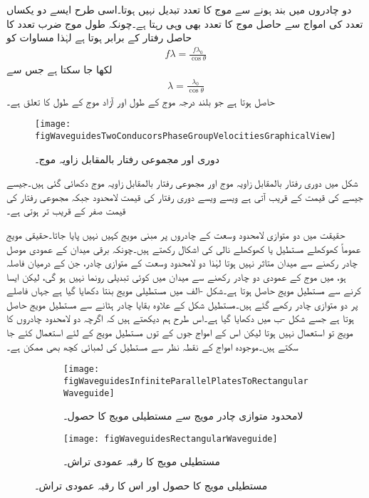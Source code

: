 دو چادروں میں بند ہونے سے  موج کا تعدد تبدیل نہیں ہوتا۔اسی طرح ایسے دو یکساں تعدد کی امواج سے حاصل  موج کا تعدد بھی وہی رہتا ہے۔چونکہ طول موج ضرب تعدد کا حاصل رفتار کے برابر ہوتا ہے لہٰذا مساوات  کو
\begin{align*}
f \lambda=\frac{f \lambda_0}{\cos \theta}
\end{align*}
لکھا جا سکتا ہے جس سے
\begin{align*}
\lambda=\frac{\lambda_0}{\cos \theta}
\end{align*}
حاصل ہوتا ہے جو بلند درجہ موج کے طول  اور آزاد موج کے طول  کا تعلق ہے۔

\begin{figure}
\centering
\texttt{[image: figWaveguidesTwoConducorsPhaseGroupVelocitiesGraphicalView]}
\caption{دوری اور مجموعی رفتار بالمقابل زاویہ موج۔}
\label{شکل_مویج_دوری_مجموعی_رفتار_بالمقابل_زاویہ}
\end{figure} 

شکل  میں دوری رفتار بالمقابل زاویہ موج اور مجموعی رفتار بالمقابل زاویہ موج دکھائی گئی ہیں۔جیسے جیسے  کی قیمت  کے قریب آتی ہے ویسے ویسے دوری رفتار کی قیمت لامحدود جبکہ مجموعی رفتار کی قیمت صفر کے قریب تر ہوتی ہے۔

حقیقت میں دو متوازی لامحدود وسعت کے چادروں پر مبنی مویج کہیں نہیں پایا جاتا۔حقیقی مویج عموماً کھوکھلے مستطیل یا کھوکھلے نالی کی اشکال رکھتے ہیں۔چونکہ برقی میدان کے عمودی موصل چادر رکھنے سے میدان متاثر نہیں ہوتا لہٰذا دو لامحدود وسعت کے متوازی چادر، جن کے درمیان فاصلہ  ہو، میں  موج کے عمودی دو چادر رکھنے سے  میدان میں کوئی تبدیلی رونما نہیں ہو گی، لیکن ایسا کرنے سے مستطیل مویج حاصل ہوتا ہے۔شکل -الف میں مستطیلی مویج بنتا  دکھایا گیا ہے جہاں  فاصلے پر دو متوازی چادر رکھے گئے ہیں۔مستطیل شکل کے علاوہ بقایا چادر ہٹانے سے مستطیل مویج حاصل ہوتا ہے جسے شکل -ب میں دکھایا گیا ہے۔اس طرح ہم دیکھتے ہیں کہ اگرچہ دو لامحدود چادروں کا مویج تو استعمال نہیں ہوتا لیکن اس کے  امواج جوں کے توں مستطیل مویج کے لئے استعمال کئے جا سکتے ہیں۔موجودہ  امواج کے نقطہ نظر سے مستطیل کی  لمبائی کچھ بھی ممکن ہے۔

\begin{figure}
\centering
\begin{subfigure}{0.5\textwidth}
\centering
\texttt{[image: figWaveguidesInfiniteParallelPlatesToRectangularWaveguide]}
\caption{لامحدود متوازی چادر مویج سے مستطیلی مویج کا حصول۔}
\label{شکل_مویج_حصول_مستطیل}
\end{subfigure}%
%
\begin{subfigure}{0.5\textwidth}
\centering
\texttt{[image: figWaveguidesRectangularWaveguide]}
\caption{مستطیلی مویج کا رقبہ عمودی تراش۔}
\label{شکل_مویج_رقبہ_عمودی_تراش_مستطیل}
\end{subfigure}%
\caption{مستطیلی مویج کا حصول اور اس کا رقبہ عمودی تراش۔}
\label{شکل_مویج_مستطیل}
\end{figure}

